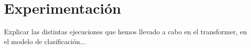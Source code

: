 \chapter{Experimentación}
Explicar las distintas ejecuciones que hemos llevado a cabo en el transformer, en el modelo de clasificación...
